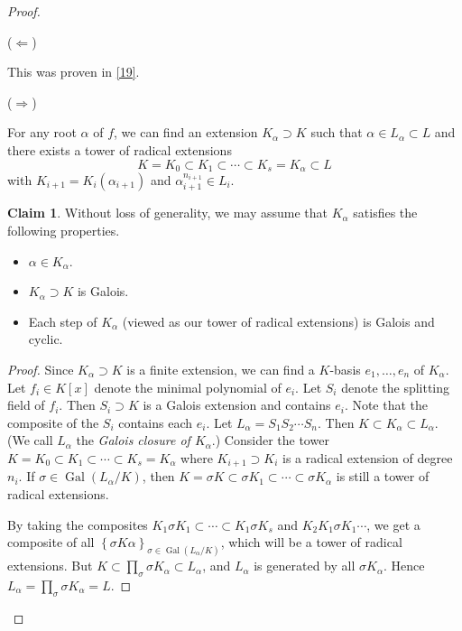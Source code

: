 \documentclass[10pt,letterpaper,cm]{nupset}
\theoremstyle{definition}
\theoremstyle{theorem}
\newtheorem*{claim}{Claim}
\theoremstyle{remark}
\newcommand{\1}{\mathbf{1}}
\newcommand{\0}{\vec 0}
\DeclareMathOperator{\gal}{Gal}
\begin{document}
\begin{proof} $ $

($\Longleftarrow$) 

This was proven in \cref{19}.

\medskip

($\Longrightarrow$) 

For any root $\alpha$ of $f$, we can find an extension $K_{\alpha} \supset K$ such that  $\alpha \in L_{\alpha} \subset L$ and there exists a tower of radical extensions $$ K = K_0 \subset K_1 \subset \cdots \subset K_s = K_{\alpha} \subset L$$ with $K_{i+1} = K_i(\alpha_{i+1})$ and $\alpha_{i+1}^{n_{i+1}} \in L_i$. 
\begin{claim}
Without loss of generality, we may assume that $K_{\alpha}$ satisfies the following properties.
\begin{itemize}
\item $\alpha \in K_{\alpha}$.
\item $K_{\alpha} \supset K$ is Galois.
\item Each step of $K_{\alpha}$ (viewed as our tower of radical extensions) is Galois and cyclic. 
\end{itemize}
\end{claim}
\begin{proof}
Since $K_{\alpha}\supset K$ is a finite extension, we can find a $K$-basis $e_1, \ldots, e_n$ of $K_{\alpha}$. Let $f_i \in K[x]$ denote the minimal polynomial of $e_i$. Let $S_i$ denote the splitting field of $f_i$. Then $S_i \supset K$ is a Galois extension and contains $e_i$. Note that the composite of the $S_i$ contains each $e_i$. Let $L_{\alpha} = S_1S_2 \cdots S_n$. Then $K \subset K_{\alpha} \subset L_{\alpha}$. (We call $L_{\alpha}$ the \textit{Galois closure of $K_{\alpha}$}.) Consider the tower $K = K_0 \subset K_1 \subset \cdots \subset K_s = K_{\alpha}$ where $K_{i+1} \supset K_i$ is a radical extension of degree $n_i$. If $\sigma \in \gal(L_{\alpha}/K)$, then $K = \sigma{K} \subset \sigma{K_1} \subset \cdots \subset \sigma{K_{\alpha}}$ is still a tower of radical extensions. 

\medskip

By taking the composites $K_1\sigma K_1 \subset \cdots \subset K_1\sigma K_s$ and $K_2K_1\sigma{K_1} \cdots$, we get  a composite of all $\left\{\sigma{K}{\alpha}\right\}_{\sigma \in \gal(L_{\alpha}/K)}$, which will be a tower of radical extensions. But $K \subset \prod_{\sigma} \sigma{K_{\alpha}} \subset L_{\alpha}$, and $L_{\alpha}$ is generated by all $\sigma{K_{\alpha}}$. Hence $L_{\alpha} = \prod_{\sigma} \sigma{K_{\alpha}} =L$.


\end{proof}
\end{proof}
\end{document}
